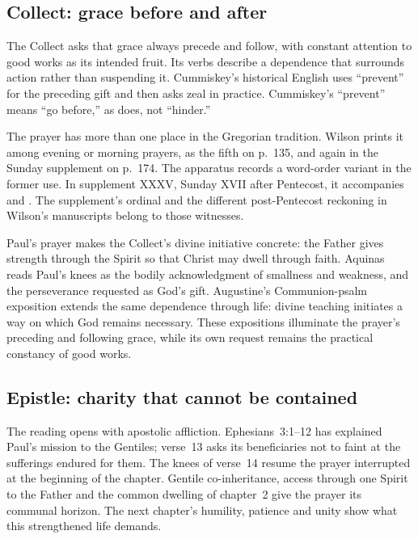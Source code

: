 \subsection*{Collect: grace before and after}
The Collect asks that grace always precede and follow, with constant attention to good works as its intended fruit. Its verbs describe a dependence that surrounds action rather than suspending it. Cummiskey's historical English uses ``prevent'' for the preceding gift and then asks zeal in practice. Cummiskey's ``prevent'' means ``go before,'' as  does, not ``hinder.''

The prayer has more than one place in the Gregorian tradition. Wilson prints it among evening or morning prayers, as the fifth  on p.~135, and again in the Sunday supplement on p.~174. The apparatus records a word-order variant in the former use. In supplement XXXV, Sunday XVII after Pentecost, it accompanies  and . The supplement's ordinal and the different post-Pentecost reckoning in Wilson's manuscripts belong to those witnesses. 

Paul's prayer makes the Collect's divine initiative concrete: the Father gives strength through the Spirit so that Christ may dwell through faith. Aquinas reads Paul's knees as the bodily acknowledgment of smallness and weakness, and the perseverance requested as God's gift. Augustine's Communion-psalm exposition extends the same dependence through life: divine teaching initiates a way on which God remains necessary. These expositions illuminate the prayer's preceding and following grace, while its own request remains the practical constancy of good works. 

\subsection*{Epistle: charity that cannot be contained}
The reading opens with apostolic affliction. Ephesians~3:1--12 has explained Paul's mission to the Gentiles; verse~13 asks its beneficiaries not to faint at the sufferings endured for them. The knees of verse~14 resume the prayer interrupted at the beginning of the chapter. Gentile co-inheritance, access through one Spirit to the Father and the common dwelling of chapter~2 give the prayer its communal horizon. The next chapter's humility, patience and unity show what this strengthened life demands. 

